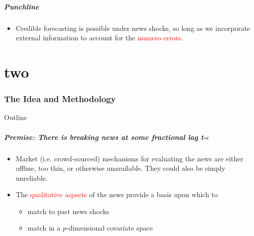 \documentclass[9pt]{beamer}
\theoremstyle{definition}
\begin{document}
\begin{frame}
    \frametitle{Punchline}
    
    \begin{itemize}
        \item <1-> Credible forecasting is possible under news shocks, so long as we incorporate external information to account for the \textcolor{red}{nonzero errors}. 
    \end{itemize}



    \end{frame}

\part{two}

\section{The Idea and Methodology}

\begin{frame}{Outline} %
    \tableofcontents[part=1,currentsection]\tableofcontents
\end{frame}

\begin{frame}
    \frametitle{Premise: There is breaking news at some fractional lag t-$\epsilon$}
    
    \begin{itemize}
    \item Market (i.e. crowd-sourced) mechanisms for evaluating the news are either offline, too thin, or otherwise unavailable.  They could also be simply unreliable.
    \item The \textcolor{red}{qualitative aspects} of the news provide a basis upon which to 
    \begin{itemize}
        \item match to past news shocks
        \item match in a $p$-dimensional covariate space
    \end{itemize}
    \end{itemize}
    \end{frame}


    
       
\end{document}
